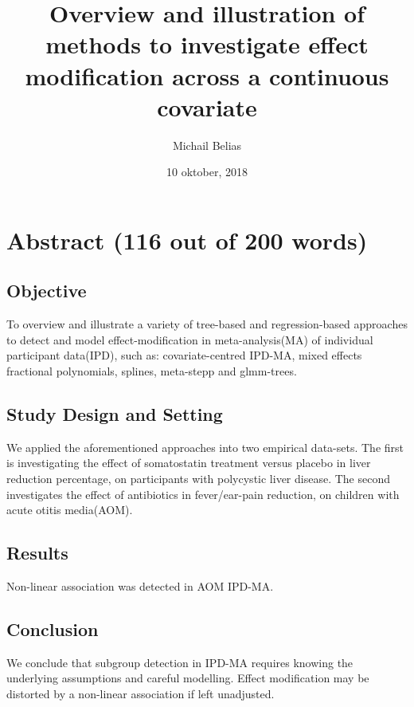 \documentclass[14pt,]{article}
\title{Overview and illustration of methods to investigate effect modification
across a continuous covariate}
\author{Michail Belias}
\date{10 oktober, 2018}
\let\oldsubparagraph\subparagraph
\renewcommand{\subparagraph}[1]{\oldsubparagraph{#1}\mbox{}}
\begin{document}
\maketitle

\section{Abstract (116 out of 200
words)}\label{abstract-116-out-of-200-words}

\subsection{Objective}\label{objective}

To overview and illustrate a variety of tree-based and regression-based
approaches to detect and model effect-modification in meta-analysis(MA)
of individual participant data(IPD), such as: covariate-centred IPD-MA,
mixed effects fractional polynomials, splines, meta-stepp and
glmm-trees.

\subsection{Study Design and Setting}\label{study-design-and-setting}

We applied the aforementioned approaches into two empirical data-sets.
The first is investigating the effect of somatostatin treatment versus
placebo in liver reduction percentage, on participants with polycystic
liver disease. The second investigates the effect of antibiotics in
fever/ear-pain reduction, on children with acute otitis media(AOM).

\subsection{Results}\label{results}

Non-linear association was detected in AOM IPD-MA.

\subsection{Conclusion}\label{conclusion}

We conclude that subgroup detection in IPD-MA requires knowing the
underlying assumptions and careful modelling. Effect modification may be
distorted by a non-linear association if left unadjusted.

\newpage

\subparagraph{}\label{section}
\end{document}
